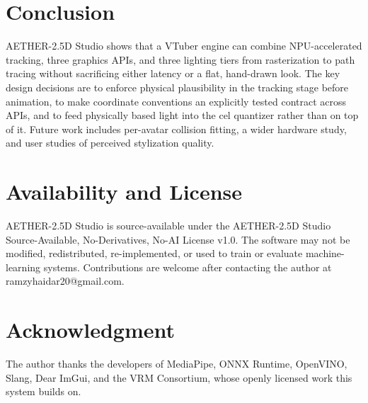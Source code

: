 \documentclass[conference]{IEEEtran}
\begin{document}
\section{Conclusion}
AETHER-2.5D Studio shows that a VTuber engine can combine NPU-accelerated tracking, three graphics APIs, and three lighting tiers from rasterization to path tracing without sacrificing either latency or a flat, hand-drawn look. The key design decisions are to enforce physical plausibility in the tracking stage before animation, to make coordinate conventions an explicitly tested contract across APIs, and to feed physically based light into the cel quantizer rather than on top of it. Future work includes per-avatar collision fitting, a wider hardware study, and user studies of perceived stylization quality.


\section*{Availability and License}
AETHER-2.5D Studio is source-available under the AETHER-2.5D Studio Source-Available, No-Derivatives, No-AI License v1.0. The software may not be modified, redistributed, re-implemented, or used to train or evaluate machine-learning systems. Contributions are welcome after contacting the author at ramzyhaidar20@gmail.com.

\section*{Acknowledgment}
The author thanks the developers of MediaPipe, ONNX Runtime, OpenVINO, Slang, Dear ImGui, and the VRM Consortium, whose openly licensed work this system builds on.
\end{document}
